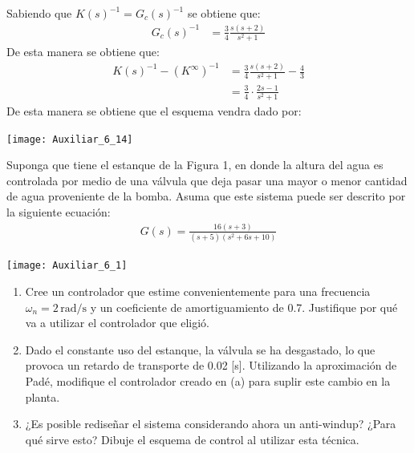 \documentclass[
  11pt,
  letterpaper,
   addpoints,
   answers
  ]{exam}
\begin{document}
\begin{questions}
\begin{solution}
    Sabiendo que $K(s)^{-1} = G_{c}(s)^{-1}$ se obtiene que:
    \begin{align}
        G_{c}(s)^{-1} &= \frac{3}{4}\frac{s(s+2)}{s^{2}+1} 
    \end{align}
    De esta manera se obtiene que:
    \begin{align}
        K(s)^{-1} - (K^{\infty})^{-1} &= \frac{3}{4}\frac{s(s+2)}{s^{2}+1} - \frac{4}{3}\\
        &=\frac{3}{4}\cdot \frac{2s-1}{s^{2}+1}
    \end{align}
    De esta manera se obtiene que el esquema vendra dado por: 
    \begin{center}
        \texttt{[image: Auxiliar\_6\_14]}
    \end{center}
    \end{solution}
    \question Suponga que tiene el estanque de la Figura 1, en donde la altura del agua es controlada por medio de una válvula que deja pasar una mayor o menor cantidad de agua proveniente de la bomba. Asuma que este sistema puede ser descrito por la siguiente ecuación:
    \begin{align}
        G(s) = \frac{16(s + 3)}{(s + 5)(s^2 + 6s + 10)}
    \end{align}
    \begin{center}
        \texttt{[image: Auxiliar\_6\_1]}
    \end{center}
    \begin{enumerate}
        \item Cree un controlador que estime convenientemente para una frecuencia \(\omega_n = 2 \, \text{rad/s}\) y un coeficiente de amortiguamiento de 0.7. Justifique por qué va a utilizar el controlador que eligió.
        \item  Dado el constante uso del estanque, la válvula se ha desgastado, lo que provoca un retardo de transporte de 0.02 [s]. Utilizando la aproximación de Padé, modifique el controlador creado en (a) para suplir este cambio en la planta.
        \item ¿Es posible rediseñar el sistema considerando ahora un anti-windup? ¿Para qué sirve esto? Dibuje el esquema de control al utilizar esta técnica.
    \end{enumerate}
\begin{solution}

\end{solution}
\end{questions}
\end{document}
